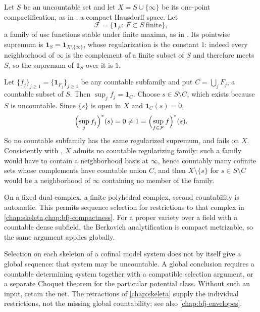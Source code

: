 \begin{example}
\label{ex:choquet-fails-uncountable}
Let $S$ be an uncountable set and let $X=S\cup\{\infty\}$ be its one-point
compactification, as in : a compact
Hausdorff space.  Let
\[
 \mathcal F=\bigl\{\mathbf 1_F:\ F\subset S\ \text{finite}\bigr\},
\]
a family of usc functions stable under finite maxima, as in
.  Its pointwise supremum is
$\mathbf 1_S=\mathbf 1_{X\setminus\{\infty\}}$, whose regularization is the
constant $1$: indeed every neighborhood of $\infty$ is the complement of a
finite subset of $S$ and therefore meets $S$, so the supremum of
$\mathbf 1_S$ over it is $1$.

Let $\{f_j\}_{j\geq1}=\{\mathbf 1_{F_j}\}_{j\geq1}$ be any countable
subfamily and put $C=\bigcup_jF_j$, a countable subset of $S$.  Then
$\sup_jf_j=\mathbf 1_C$.  Choose $s\in S\setminus C$, which exists because $S$
is uncountable.  Since $\{s\}$ is open in $X$ and $\mathbf 1_C(s)=0$,
\[
 \Bigl(\sup_jf_j\Bigr)^*(s)=0\neq1=\Bigl(\sup_{f\in\mathcal F}f\Bigr)^*(s).
\]
So no countable subfamily has the same regularized supremum, and
 fails on $X$.  Consistently with
, $X$ admits no countable regularizing
family: such a family would have to contain a neighborhood basis at
$\infty$, hence countably many cofinite sets whose complements have countable
union $C$, and then $X\setminus\{s\}$ for $s\in S\setminus C$ would be a
neighborhood of $\infty$ containing no member of the family.
\end{example}

\begin{remark}
\label{rem:choquet-where-countable}
On a fixed dual complex, a finite polyhedral complex, second countability
is automatic.  This permits sequence selection for restrictions to that
complex in \cref{chap:skeleta,chap:bfj-compactness}.  For a proper variety
over a field with a countable dense subfield, the Berkovich analytification
is compact metrizable, so the same argument applies globally.

Selection on each skeleton of a cofinal model system does not by itself
give a global sequence: that system may be uncountable.  A global conclusion
requires a countable determining system together with a compatible selection
argument, or a separate Choquet theorem for the particular potential class.
Without such an input, retain the net.  The retractions of
\cref{chap:skeleta} supply the individual restrictions, not the missing
global countability; see also \cref{chap:bfj-envelopes}.
\end{remark}

